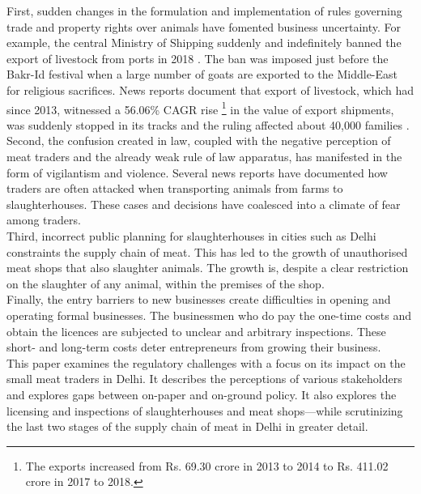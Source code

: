 \documentclass[a4paper, 12pt]{article}
\begin{document}
First, sudden changes in the formulation and implementation of rules governing trade and property rights over animals have fomented business uncertainty. For example, the central Ministry of Shipping suddenly and indefinitely banned the export of livestock from ports in 2018 \parencite{kateshiyanews}. The ban was imposed just before the Bakr-Id festival when a large number of goats are exported to the Middle-East for religious sacrifices. News reports document that export of livestock, which had since 2013, witnessed a 56.06\% CAGR rise \footnote { The exports increased from Rs. 69.30 crore in 2013 to 2014 to Rs. 411.02 crore in 2017 to 2018.} in the value of export shipments, was suddenly stopped in its tracks and the ruling affected about 40,000 families \parencite{hindunews}. \\

Second, the confusion created in law, coupled with the negative perception of meat traders and the already weak rule of law apparatus, has manifested in the form of vigilantism and violence. Several news reports have documented how traders are often attacked when transporting animals from farms to slaughterhouses. These cases and decisions have coalesced into a climate of fear among traders.\\

Third, incorrect public planning for slaughterhouses in cities such as Delhi constraints the supply chain of meat. This has led to the growth of unauthorised meat shops that also slaughter animals. The growth is, despite a clear restriction on the slaughter of any animal, within the premises of the shop. \\

Finally, the entry barriers to new businesses create difficulties in opening and operating formal businesses. The businessmen who do pay the one-time costs and obtain the licences are subjected to unclear and arbitrary inspections. These short- and long-term costs deter entrepreneurs from growing their business. \\

This paper examines the regulatory challenges with a focus on its impact on the small meat traders in Delhi. It describes the perceptions of various stakeholders and explores gaps between on-paper and on-ground policy. It also explores the licensing and inspections of slaughterhouses and meat shops—while scrutinizing the last two stages of the supply chain of meat in Delhi in greater detail.\\
\end{document}
